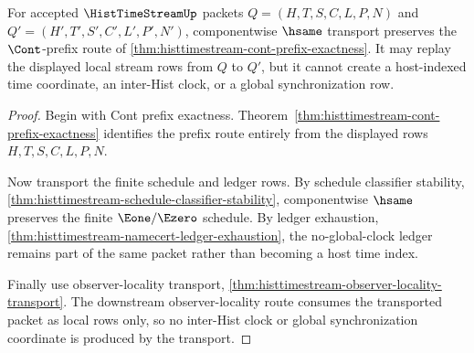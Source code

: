 \begin{theorem}
\label{thm:histtimestream-hsame-prefix-transport}
For accepted $\HistTimeStreamUp$ packets $Q=(H,T,S,C,L,P,N)$ and $Q'=(H',T',S',C',L',P',N')$, componentwise $\hsame$ transport preserves the $\Cont$-prefix route of \autoref{thm:histtimestream-cont-prefix-exactness}. It may replay the displayed local stream rows from $Q$ to $Q'$, but it cannot create a host-indexed time coordinate, an inter-Hist clock, or a global synchronization row.
\end{theorem}
\begin{proof}
Begin with Cont prefix exactness. Theorem~\ref{thm:histtimestream-cont-prefix-exactness} identifies the prefix route entirely from the displayed rows $H,T,S,C,L,P,N$.

Now transport the finite schedule and ledger rows. By schedule classifier stability, \autoref{thm:histtimestream-schedule-classifier-stability}, componentwise $\hsame$ preserves the finite $\Eone/\Ezero$ schedule. By ledger exhaustion, \autoref{thm:histtimestream-namecert-ledger-exhaustion}, the no-global-clock ledger remains part of the same packet rather than becoming a host time index.

Finally use observer-locality transport, \autoref{thm:histtimestream-observer-locality-transport}. The downstream observer-locality route consumes the transported packet as local rows only, so no inter-Hist clock or global synchronization coordinate is produced by the transport.
\end{proof}

